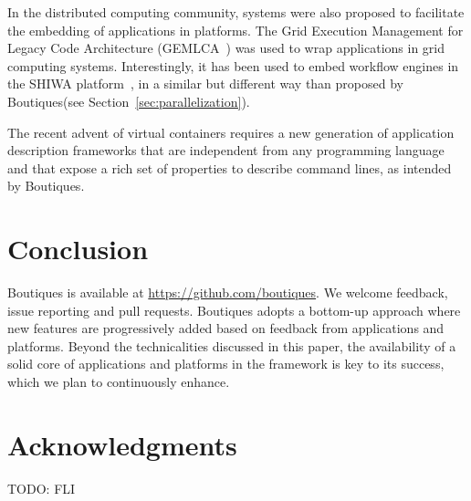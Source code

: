 \documentclass[a4paper,num-refs]{oup-contemporary}
\newcommand{\todo}[1]{\color{red}TODO: #1\color{black}}
\newcommand{\boutiques}{Boutiques\xspace}
\begin{document}
In the distributed computing community, systems were also proposed to
facilitate the embedding of applications in platforms. The Grid
Execution Management for Legacy Code Architecture
(GEMLCA~\cite{delaitre2005gemlca}) was used to wrap applications in
grid computing systems. Interestingly, it has been used to embed
workflow engines in the SHIWA
platform~\cite{terstyanszky2014enabling}, in a similar but different
way than proposed by \boutiques (see Section~\ref{sec:parallelization}).

The recent advent of virtual containers requires a new generation of
application description frameworks that are independent from any
programming language and that expose a rich set of properties to
describe command lines, as intended by \boutiques.

\section{Conclusion}

\boutiques is available at \url{https://github.com/boutiques}. We
welcome feedback, issue reporting and pull requests. \boutiques adopts
a bottom-up approach where new features are progressively added based
on feedback from applications and platforms. Beyond the technicalities
discussed in this paper, the availability of a solid core of
applications and platforms in the framework is key to its success,
which we plan to continuously enhance.

\section{Acknowledgments}

\todo{FLI}


\end{document}
